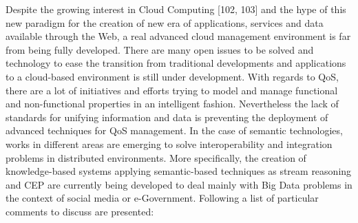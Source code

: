 Despite the growing interest in Cloud Computing [102, 103] and the hype of this 
new paradigm for the creation of new era of applications, services and data 
available through the Web, a real advanced cloud management environment is far 
from being fully developed. There are many open issues to be solved and 
technology to ease the transition from traditional developments and applications 
to a cloud-based environment is still under development. With regards to QoS, 
there are a lot of initiatives and efforts trying to model and manage functional 
and non-functional properties in an intelligent fashion. Nevertheless the lack 
of standards for unifying information and data is preventing the deployment of 
advanced techniques for QoS management. In the case of semantic technologies, 
works in different areas are emerging to solve interoperability and integration 
problems in distributed environments. More specifically, the creation of 
knowledge-based systems applying semantic-based techniques as stream reasoning 
and CEP are currently being developed to deal mainly with Big Data problems in the 
context of social media or e-Government. Following a list of particular comments 
to discuss are presented:
